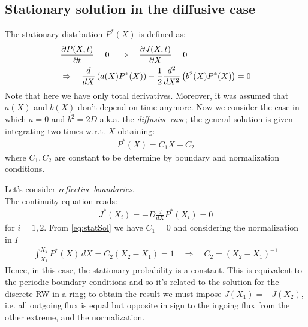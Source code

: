 \documentclass[4apaper,11pt,fleqn]{article}
\theoremstyle{remark}
\theoremstyle{definition}
\begin{document}
\subsection{Stationary solution in the diffusive case}
The stationary distrbution $P^{*}(X)$ is defined as:
\begin{align}
  \label{eq:dx_flux}
  &\frac{\partial P(X, t)}{\partial t} = 0 \quad \Rightarrow \quad \frac{\partial J(X, t)}{\partial X}=0 \\ \notag
  &\Rightarrow \quad \frac{d}{d X}\left(a(X) P^{*}(X)\right)-\frac{1}{2} \frac{d^{2}}{d X^{2}}\left(b^{2}(X) P^{*}(X)\right)=0
\end{align}
Note that here we have only total derivatives. Moreover, it was assumed that $a(X)$ and $b(X)$ don't depend on time anymore.
Now we consider the case in which $a = 0$ and $b^2 =2D$ a.k.a. the \emph{diffusive case}; the general solution is given integrating two times w.r.t. $X$ obtaining:
\begin{align}
  \label{eq:statSol}
  P^*(X) = C_1 X + C_2
\end{align}
where $C_1, C_2$ are constant to be determine by boundary and normalization conditions.

Let's consider \emph{reflective boundaries}.\\
The continuity equation reads:
\begin{align*}
  J^* (X_i) = -D \frac{d }{d X} P^*(X_i) = 0
\end{align*}
for $i = 1,2$. From \eqref{eq:statSol} we have $C_1 = 0$ and considering the normalization in $I$
\begin{align*}
  \int_{X_1}^{X_2} P^* (X) \, dX = C_2 (X_2 - X_1) = 1 \quad \Rightarrow \quad C_2 = (X_2 - X_1)^{-1}
\end{align*}
Hence, in this case, the stationary probability is a constant. This is equivalent to the periodic boundary conditions and so it's related to the solution for the discrete RW in a ring; to obtain the result we must impose $J(X_1)=-J(X_2)$, i.e. all outgoing flux is equal but opposite in sign to the ingoing flux from the other extreme, and the normalization.
\end{document}
